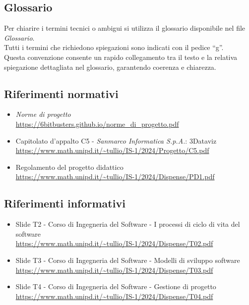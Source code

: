\subsection{Glossario}
Per chiarire i termini tecnici o ambigui si utilizza il glossario disponibile nel file \textit{Glossario}.\\
Tutti i termini che richiedono spiegazioni sono indicati con il pedice “g”. \\
Questa convenzione consente un rapido collegamento tra il testo e la relativa spiegazione dettagliata nel glossario, garantendo coerenza e chiarezza.

\subsection{Riferimenti normativi}
\begin{itemize}
      \item \textit{Norme di progetto} \\ \url{https://6bitbusters.github.io/norme_di_progetto.pdf}
      \item Capitolato d'appalto C5 - \textit{Sanmarco Informatica S.p.A.}: 3Dataviz \\ \url{https://www.math.unipd.it/~tullio/IS-1/2024/Progetto/C5.pdf}
      \item Regolamento del progetto didattico \\ \url{https://www.math.unipd.it/~tullio/IS-1/2024/Dispense/PD1.pdf}
\end{itemize}
\subsection{Riferimenti informativi}
\begin{itemize}
      \item Slide T2 - Corso di Ingegneria del Software - I processi di ciclo di vita del software\\ \url{https://www.math.unipd.it/~tullio/IS-1/2024/Dispense/T02.pdf}
      \item Slide T3 - Corso di Ingegneria del Software - Modelli di sviluppo software \\ \url{https://www.math.unipd.it/~tullio/IS-1/2024/Dispense/T03.pdf}
      \item Slide T4 - Corso di Ingegneria del Software - Gestione di progetto \\ \url{https://www.math.unipd.it/~tullio/IS-1/2024/Dispense/T04.pdf}
\end{itemize}
